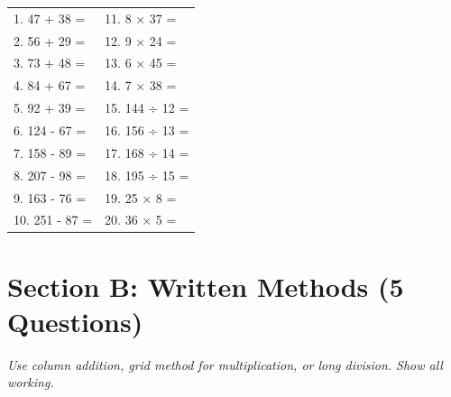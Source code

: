 \documentclass{article}
\begin{document}
\begin{tabular}{ll}
1. 47 + 38 = \underline{\hspace{2cm}} & 11. 8 × 37 = \underline{\hspace{2cm}} \\
2. 56 + 29 = \underline{\hspace{2cm}} & 12. 9 × 24 = \underline{\hspace{2cm}} \\
3. 73 + 48 = \underline{\hspace{2cm}} & 13. 6 × 45 = \underline{\hspace{2cm}} \\
4. 84 + 67 = \underline{\hspace{2cm}} & 14. 7 × 38 = \underline{\hspace{2cm}} \\
5. 92 + 39 = \underline{\hspace{2cm}} & 15. 144 ÷ 12 = \underline{\hspace{2cm}} \\
6. 124 - 67 = \underline{\hspace{2cm}} & 16. 156 ÷ 13 = \underline{\hspace{2cm}} \\
7. 158 - 89 = \underline{\hspace{2cm}} & 17. 168 ÷ 14 = \underline{\hspace{2cm}} \\
8. 207 - 98 = \underline{\hspace{2cm}} & 18. 195 ÷ 15 = \underline{\hspace{2cm}} \\
9. 163 - 76 = \underline{\hspace{2cm}} & 19. 25 × 8 = \underline{\hspace{2cm}} \\
10. 251 - 87 = \underline{\hspace{2cm}} & 20. 36 × 5 = \underline{\hspace{2cm}} \\
\end{tabular}

\vspace{0.5cm}

\section{Section B: Written Methods (5 Questions)}
\textit{Use column addition, grid method for multiplication, or long division. Show all working.}
\end{document}
